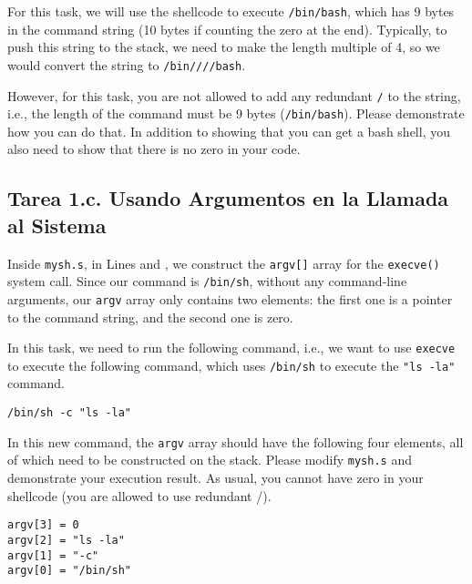 For this task, we will use the shellcode to execute
\texttt{/bin/bash}, which has 9 bytes in the command string (10 bytes if 
counting the zero at the end). Typically, to push
this string to the stack, we need to make the length
multiple of 4, so we would convert the string
to \texttt{/bin////bash}. 

However, for this task,   
you are not allowed to add any
redundant \texttt{/} to the string, i.e., the length of the 
command must be 9 bytes (\texttt{/bin/bash}).
Please demonstrate how you can do that.
In addition to showing that you can get a bash shell, you also
need to show that there is no zero in your code. 



\subsection{Tarea 1.c. Usando Argumentos en la Llamada al Sistema}
 
Inside \texttt{mysh.s}, in Lines  and ,
we construct the \texttt{argv[]} array for the 
\texttt{execve()} system call. Since 
our command is \texttt{/bin/sh}, without any command-line
arguments, our \texttt{argv} array only contains 
two elements: the first one is a pointer to 
the command string, and the second one is zero. 

In this task, we need to run the 
following command, i.e., we want to use 
\texttt{execve} to execute the following command, which
uses \texttt{/bin/sh} to execute the \texttt{"ls -la"}
command. 

\begin{lstlisting}
/bin/sh -c "ls -la"
\end{lstlisting}

In this new command, the \texttt{argv} array should have 
the following four elements, all of which need to be 
constructed on the stack. Please modify \texttt{mysh.s} and 
demonstrate your execution result. As usual, you cannot have 
zero in your shellcode (you are allowed to use redundant /). 

\begin{lstlisting}
argv[3] = 0
argv[2] = "ls -la"
argv[1] = "-c"
argv[0] = "/bin/sh"
\end{lstlisting}
 


